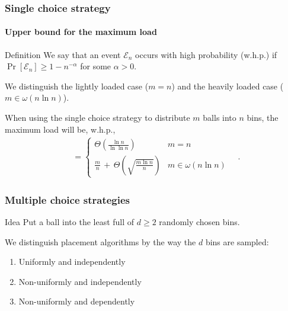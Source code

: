 \documentclass[professionalfonts]{beamer}
\DeclareMathOperator{\load}{L_{\max}} %
\DeclareMathOperator{\loadS}{L_{\max}^{S}}
\begin{document}
\begin{frame}
\frametitle{Single choice strategy}
\framesubtitle{Upper bound for the maximum load}

\begin{exampleblock}{Definition}
We say that an event $\mathcal E_n$ occurs \alert{with high probability} (w.h.p.) if $\Pr\left[\mathcal E_n \right] \geq 1 - n^{-\alpha}$ for some $\alpha > 0$.
\end{exampleblock}

\pause
\medskip
We distinguish the \alert{lightly loaded} case ($m = n$) and the \alert{heavily loaded} case ($m \in \omega(n\ln n)$).

\medskip
\begin{theorem}
When using the \alert{single choice} strategy to distribute $m$ balls into $n$ bins, the maximum load will be, w.h.p.,
\begin{align*}
\loadS = 
	\begin{cases}
    \Theta\left(\frac{\ln n}{\ln\ln n}\right)           & m = n \\
    \frac{m}{n}  \, + \, \Theta\left(\sqrt{\frac{m\ln n}{n}} \right)              & m \in \omega(n \ln n)
    \end{cases} \quad .
\end{align*}
\end{theorem}
\end{frame}

\begin{frame}
\frametitle{Multiple choice strategies}
\begin{exampleblock}{Idea}
Put a ball into the \alert{least full} of $d\geq2$ randomly chosen bins.
\end{exampleblock}

\bigskip
We distinguish placement algorithms by the way the \alert{$d$ bins are sampled}:
\begin{enumerate}
\item Uniformly and independently
\item Non-uniformly and independently
\item Non-uniformly and dependently
\end{enumerate}
\end{frame}
\end{document}
